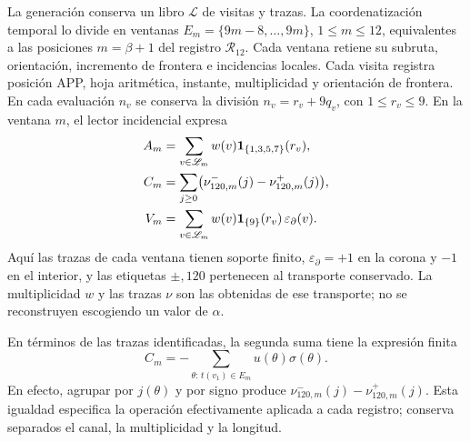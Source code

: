 La generación conserva un libro \(\mathscr L\) de visitas y trazas.
La coordenatización temporal lo divide en ventanas
\(E_m=\{9m-8,\ldots,9m\}\), \(1\le m\le12\),
equivalentes a las posiciones \(m=\beta+1\) del registro
\(\mathcal R_{12}\). Cada ventana retiene su subruta,
orientación, incremento de frontera e incidencias locales.
Cada visita registra posición APP, hoja aritmética, instante, multiplicidad
y orientación de frontera. En cada evaluación \(n_v\) se conserva la
división \(n_v=r_v+9q_v\), con \(1\le r_v\le9\). En la ventana
\(m\), el lector incidencial expresa
\begin{align}
 A_m&=\sum_{v\in\mathscr L_m}w(v)
      \mathbf1_{\{1,3,5,7\}}(r_v),\notag\\
 C_m&=\sum_{j\ge0}
       \bigl(\nu^-_{120,m}(j)-\nu^+_{120,m}(j)\bigr),\notag\\
 V_m&=\sum_{v\in\mathscr L_m}w(v)
      \mathbf1_{\{9\}}(r_v)\,\varepsilon_{\partial}(v).
 \label{vi:dep:incidencias}
\end{align}
Aquí las trazas de cada ventana tienen soporte finito,
\(\varepsilon_{\partial}=+1\) en la corona y \(-1\) en el interior,
y las etiquetas \(\pm,120\) pertenecen al transporte conservado.
La multiplicidad \(w\) y las trazas \(\nu\) son las obtenidas de ese
transporte; no se reconstruyen escogiendo un valor de \(\alpha\).

En términos de las trazas identificadas, la segunda suma tiene la
expresión finita
\[
 C_m=-\sum_{\theta:\,t(v_1)\in E_m}u(\theta)\sigma(\theta).
\]
En efecto, agrupar por \(j(\theta)\) y por signo produce
\(\nu^-_{120,m}(j)-\nu^+_{120,m}(j)\). Esta igualdad especifica
la operación efectivamente aplicada a cada registro; conserva
separados el canal, la multiplicidad y la longitud.

